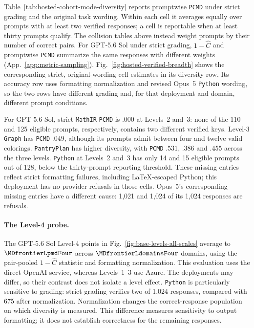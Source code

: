 \documentclass{article}
\newcommand{\1}{\mathbf 1}
\newcommand{\pmd}{\texttt{PCMD}}
\theoremstyle{remark}
\theoremstyle{definition}
\theoremstyle{plain}
\begin{document}
Table~\ref{tab:hosted-cohort-mode-diversity} reports promptwise \pmd{}
under strict grading and the original task wording. Within each cell it
averages equally over prompts with at least two verified responses; a cell
is reportable when at least thirty prompts qualify. The collision tables
above instead weight prompts by their number of correct pairs. For GPT-5.6
Sol under strict grading, $1-\widehat C$ and promptwise \pmd{} summarize
the same responses with different weights (App.~\ref{app:metric-sampling}).
Fig.~\ref{fig:hosted-verified-breadth} shows the corresponding strict,
original-wording cell estimates in its diversity row. Its accuracy row uses
formatting normalization and revised Opus~5 \texttt{Python} wording, so the two rows
have different grading and, for that deployment and domain, different
prompt conditions.

For GPT-5.6 Sol, strict \texttt{MathIR} \pmd{} is $.000$ at Levels~2 and~3: none of
the 110 and 125 eligible prompts, respectively, contains two different
verified keys. Level-3 \texttt{Graph} has \pmd{} $.049$, although its prompts admit
between four and twelve valid colorings. \texttt{PantryPlan} has higher diversity,
with \pmd{} $.531$, $.386$ and $.455$ across the three levels. \texttt{Python} at
Levels~2 and~3 has only 14 and 15 eligible prompts out of 128, below the
thirty-prompt reporting threshold. These missing entries reflect strict
formatting failures, including LaTeX-escaped Python; this deployment has no
provider refusals in those cells. Opus~5's corresponding missing entries
have a different cause: 1,021 and 1,024 of its 1,024 responses are refusals.

\paragraph{The Level-4 probe.}
The GPT-5.6 Sol Level-4 points in Fig.~\ref{fig:base-levels-all-scales}
average to $\MDfrontierLpmdFour$ across $\MDfrontierLdomainsFour$ domains,
using the pair-pooled $1-\widehat C$ statistic and formatting normalization.
This evaluation uses the direct OpenAI service, whereas Levels~1--3 use
Azure. The deployments may differ, so their contrast does not isolate a
level effect. \texttt{Python} is particularly sensitive to grading: strict grading
verifies two of 1,024 responses, compared with 675 after normalization.
Normalization changes the correct-response population on which diversity
is measured. This difference measures sensitivity to output formatting;
it does not establish correctness for the remaining responses.
\end{document}
